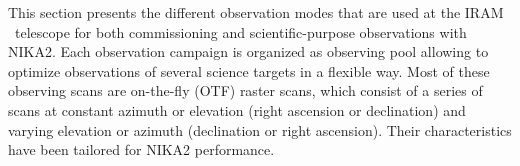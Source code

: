 

This section presents the different observation modes that are used at
the IRAM \trentemetre\ telescope for both commissioning and
scientific-purpose observations with NIKA2. {\lp Each observation
campaign is organized as observing pool allowing to optimize
observations of several science targets in a flexible way.}
Most of these observing scans are on-the-fly (OTF) raster scans,
which consist of a series of scans at constant azimuth or elevation
(right ascension or declination) and varying elevation or azimuth
(declination or right ascension).
Their characteristics have been tailored for NIKA2 performance.



